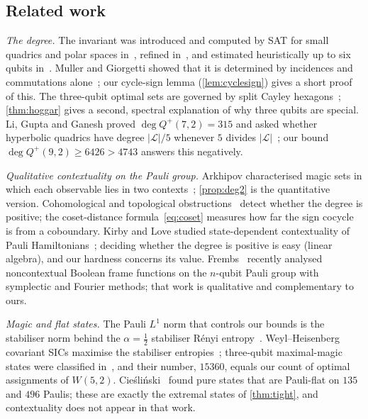 \documentclass[a4paper,onecolumn,11pt,unpublished,nopdfoutputerror]{quantumarticle}
\theoremstyle{definition}
\renewcommand{\deg}{\operatorname{deg}}
\newcommand{\Lines}{\mathcal{L}}
\newcommand{\W}[1]{W(#1,2)}
\newcommand{\Qp}[1]{Q^{+}(#1,2)}
\begin{document}
\subsection{Related work}

\emph{The degree.} The invariant was introduced and computed by SAT for small quadrics and polar spaces
in~\cite{deBoutray2022}, refined in~\cite{Muller2024}, and estimated heuristically up to six qubits
in~\cite{Muller2024heur}. Muller and Giorgetti showed that it is determined by incidences and commutations
alone~\cite{MullerGiorgetti2025}; our cycle-sign lemma (\cref{lem:cyclesign}) gives a short proof of this.
The three-qubit optimal sets are governed by split Cayley hexagons~\cite{Saniga2023}; \cref{thm:hoggar} gives a
second, spectral explanation of why three qubits are special. Li, Gupta and Ganesh proved $\deg\Qp7=315$ and asked
whether hyperbolic quadrics have degree $|\Lines|/5$ whenever $5$ divides $|\Lines|$~\cite{LiGuptaGanesh2026}; our
bound $\deg\Qp9\ge6426>4743$ answers this negatively.

\emph{Qualitative contextuality on the Pauli group.} Arkhipov characterised magic sets in which each observable
lies in two contexts~\cite{Arkhipov2012}; \cref{prop:deg2} is the quantitative version. Cohomological and
topological obstructions~\cite{OkayRobertsBartlettRaussendorf2017,OkayRaussendorf2020,AbramskyEtAl2015} detect
whether the degree is positive; the coset-distance formula~\eqref{eq:coset} measures how far the sign cocycle is
from a coboundary. Kirby and Love studied state-dependent contextuality of Pauli Hamiltonians~\cite{KirbyLove2019};
deciding whether the degree is positive is easy (linear algebra), and our hardness concerns its value.
Frembs~\cite{Frembs2026} recently analysed noncontextual Boolean frame functions on the $n$-qubit Pauli group with
symplectic and Fourier methods; that work is qualitative and complementary to ours.

\emph{Magic and flat states.} The Pauli $L^1$ norm that controls our bounds is the stabiliser norm behind the
$\alpha=\tfrac12$ stabiliser R\'enyi entropy~\cite{LeoneOlivieroHamma2022}. Weyl--Heisenberg covariant SICs maximise
the stabiliser entropies~\cite{CuffaroFuchs2024}; three-qubit maximal-magic states were classified
in~\cite{ExtremalMagic2025}, and their number, $15360$, equals our count of optimal assignments of $\W5$.
Cie\'sli\'nski~\cite{Cieslinski2026} found pure states that are Pauli-flat on $135$ and $496$ Paulis; these are
exactly the extremal states of \cref{thm:tight}, and contextuality does not appear in that work.
\end{document}
